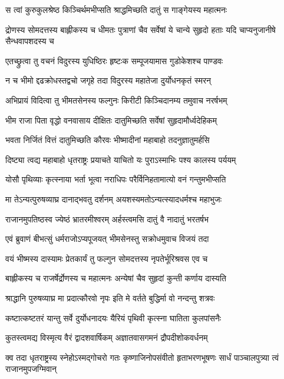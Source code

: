 \twolineshloka
{स त्वां कुरुकुलश्रेष्ठ किञ्चिर्थमभीप्सति}
{श्राद्धमिच्छति दातुं स गाङ्गेयस्य महात्मनः}


\threelineshloka
{द्रोणस्य सोमदत्तस्य बाह्लीकस्य च धीमतः}
{पुत्राणां चैव सर्वेषां ये चान्ये सुहृदो हताः}
{यदि चाप्यनुजानीषे सैन्धवापशदस्य च}


\twolineshloka
{एतच्छ्रुत्वा तु वचनं विदुरस्य युधिष्ठिरः}
{हृष्टःक सम्पूजयामास गुडोकेशश्च पाण्डवः}


\twolineshloka
{न च भीमो द्दढक्रोधस्तद्वचो जगृहे तदा}
{विदुरस्य महातेजा दुर्योधनकृतं स्मरन्}


\twolineshloka
{अभिप्रायं विदित्वा तु भीमतसेनस्य फल्गुनः}
{किरीटी किञ्चिदानम्य तमुवाच नरर्षभम्}


\twolineshloka
{भीम राजा पिता वृद्धो वनवासाय दीक्षितः}
{दातुमिच्छति सर्वेषां सुहृदामौर्ध्वदेहिकम्}


\twolineshloka
{भवता निर्जितं वित्तं दातुमिच्छति कौरवः}
{भीष्मादीनां महाबाहो तदनुज्ञातुमर्हसि}


\twolineshloka
{दिष्ट्या त्वद्य महाबाहो धृतराष्ट्रः प्रयाचते}
{याचितो यः पुराऽस्माभिः पश्य कालस्य पर्ययम्}


\twolineshloka
{योसौ पृथिव्याः कृत्स्नाया भर्ता भूत्वा नराधिपः}
{परैर्विनिहतामात्यो वनं गन्तुमभीप्सति}


\twolineshloka
{मा तेऽन्यत्पुरुषव्याघ्र दानाद्भवतु दर्शनम्}
{अयशस्यमतोऽन्यत्स्यादधर्मश्च महाभुजः}


\twolineshloka
{राजानमुपतिष्ठस्व ज्येष्ठं भ्रातरमीश्वरम्}
{अर्हस्त्वमसि दातुं वै नादातुं भरतर्षभ}


\twolineshloka
{एवं ब्रुवाणं बीभत्सुं धर्मराजोऽप्यपूजयत्}
{भीमसेनस्तु सक्रोधमुवाच विजयं तदा}


\twolineshloka
{वयं भीष्मस्य दास्यामः प्रेतकार्यं तु फल्गुन}
{सोमदत्तस्य नृपतेर्भूरिश्रवस एव च}


\twolineshloka
{बाह्लीकस्य च राजर्षेर्द्रोणस्य च महात्मनः}
{अन्येषां चैव सुहृदां कुन्ती कर्णाय दास्यति}


\twolineshloka
{श्राद्धानि पुरुषव्याघ्र मा प्रदात्कौरवो नृपः}
{इति मे वर्तते बुद्धिर्मा वो नन्दन्तु शत्रवः}


\twolineshloka
{कष्टात्कष्टतरं यान्तु सर्वे दुर्योधनादयः}
{यैरियं पृथिवी कृत्स्ना घातिता कुलपांसनैः}


\twolineshloka
{कुतस्त्वमद्य विस्मृत्य वैरं द्वादशवार्षिकम्}
{अज्ञातवासगमनं द्रौपदीशोकवर्धनम्}


\threelineshloka
{क्व तदा धृतराष्ट्रस्य स्नेहोऽस्मद्गोचरो गतः}
{कृष्णाजिनोपसंवीतो हृताभरणभूषणः}
{सार्धं पाञ्चालपुत्र्या त्वं राजानमुपजग्मिवान्}


